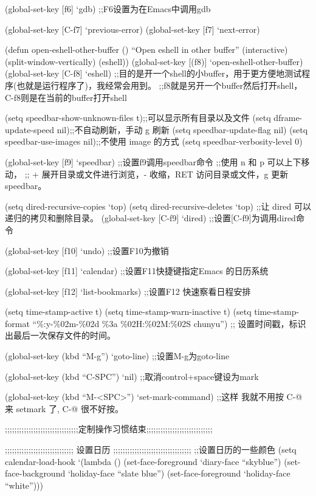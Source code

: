 \documentclass[11pt]{article}
\begin{document}
\begin{itemize}
(global-set-key [f6] `gdb)             
;;F6设置为在Emacs中调用gdb

(global-set-key [C-f7] `previous-error)
(global-set-key [f7] `next-error)

(defun open-eshell-other-buffer ()
  ``Open eshell in other buffer''
  (interactive)
  (split-window-vertically)
  (eshell))
(global-set-key [(f8)] `open-eshell-other-buffer)
(global-set-key [C-f8] `eshell)
;;目的是开一个shell的小buffer，用于更方便地测试程序(也就是运行程序了)，我经常会用到。
;;f8就是另开一个buffer然后打开shell，C-f8则是在当前的buffer打开shell

(setq speedbar-show-unknown-files t);;可以显示所有目录以及文件
(setq dframe-update-speed nil);;不自动刷新，手动 g 刷新
(setq speedbar-update-flag nil)
(setq speedbar-use-images nil);;不使用 image 的方式
(setq speedbar-verbosity-level 0)

(global-set-key [f9] `speedbar)
;;设置f9调用speedbar命令
;;使用 n 和 p 可以上下移动，
;; + 展开目录或文件进行浏览，- 收缩，RET 访问目录或文件，g 更新 speedbar。

(setq dired-recursive-copies `top)
(setq dired-recursive-deletes `top)
;;让 dired 可以递归的拷贝和删除目录。
(global-set-key [C-f9] `dired)
;;设置[C-f9]为调用dired命令

(global-set-key [f10] `undo)             
;;设置F10为撤销

(global-set-key [f11] `calendar) 
;;设置F11快捷键指定Emacs 的日历系统

(global-set-key [f12] `list-bookmarks)
;;设置F12 快速察看日程安排

(setq time-stamp-active t)
(setq time-stamp-warn-inactive t)
(setq time-stamp-format ``\%:y-\%02m-\%02d \%3a \%02H:\%02M:\%02S chunyu'')
;; 设置时间戳，标识出最后一次保存文件的时间。

(global-set-key (kbd ``M-g'') `goto-line)
;;设置M-g为goto-line

(global-set-key (kbd ``C-SPC'') `nil)
;;取消control+space键设为mark

(global-set-key (kbd ``M-<SPC>'') `set-mark-command)
;;这样 我就不用按 C-@ 来 setmark 了, C-@ 很不好按。

;;;;;;;;;;;;;;;;;;;;;;;;;;;;;;;定制操作习惯结束;;;;;;;;;;;;;;;;;;;;;;;;;;;;


;;;;;;;;;;;;;;;;;;;;;;;;;;;;;  设置日历 ;;;;;;;;;;;;;;;;;;;;;;;;;;;;;;;;;
;;设置日历的一些颜色
(setq calendar-load-hook
`(lambda ()
(set-face-foreground `diary-face ``skyblue'')
(set-face-background `holiday-face ``slate blue'')
(set-face-foreground `holiday-face ``white'')))


\end{itemize}
\end{document}
